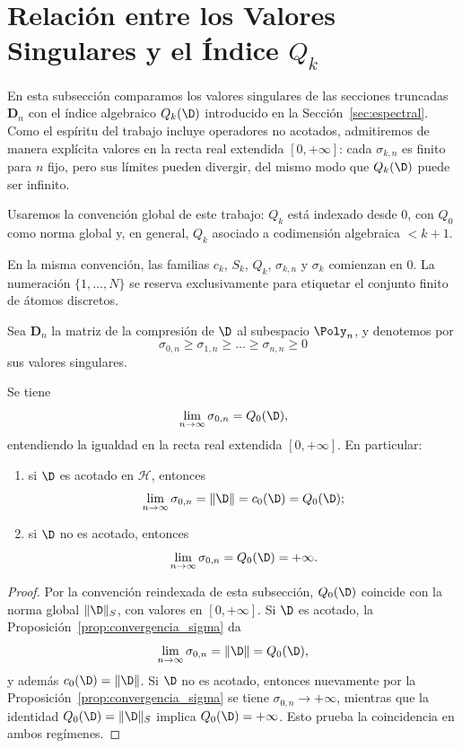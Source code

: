 \section{Relación entre los Valores Singulares y el Índice \texorpdfstring{$Q_k$}{Q_k}}

En esta subsección comparamos los valores singulares de las secciones truncadas $\mathbf{D}_n$ con el índice algebraico $Q_k(\D)$ introducido en la Sección~\ref{sec:espectral}. Como el espíritu del trabajo incluye operadores no acotados, admitiremos de manera explícita valores en la recta real extendida $[0,+\infty]$: cada $\sigma_{k,n}$ es finito para $n$ fijo, pero sus límites pueden divergir, del mismo modo que $Q_k(\D)$ puede ser infinito.

Usaremos la convención global de este trabajo: $Q_k$ está indexado desde $0$, con $Q_0$ como norma global y, en general, $Q_k$ asociado a codimensión algebraica $<k+1$.

En la misma convención, las familias $c_k$, $S_k$, $Q_k$, $\sigma_{k,n}$ y $\sigma_k$ comienzan en $0$. La numeración $\{1,\dots,N\}$ se reserva exclusivamente para etiquetar el conjunto finito de átomos discretos.

Sea $\mathbf{D}_n$ la matriz de la compresión de $\D$ al subespacio $\Poly_{n}$, y denotemos por
\[
	\sigma_{0,n} \ge \sigma_{1,n} \ge \dots \ge \sigma_{n,n} \ge 0
\]
sus valores singulares.

\begin{thm}\label{thm:sigma1_q1_extendido}
	Se tiene
	\[
		\lim_{n \to \infty} \sigma_{0,n} = Q_0(\D),
	\]
	entendiendo la igualdad en la recta real extendida $[0,+\infty]$. En particular:
	\begin{enumerate}
		\item si $\D$ es acotado en $\mathcal{H}$, entonces
		      \[
			      \lim_{n \to \infty} \sigma_{0,n} = \|\D\| = c_0(\D) = Q_0(\D);
		      \]
		\item si $\D$ no es acotado, entonces
		      \[
			      \lim_{n \to \infty} \sigma_{0,n} = Q_0(\D) = +\infty.
		      \]
	\end{enumerate}
\end{thm}

\begin{proof}
	Por la convención reindexada de esta subsección, $Q_0(\D)$ coincide con la norma global $\|\D\|_S$, con valores en $[0,+\infty]$. Si $\D$ es acotado, la Proposición~\ref{prop:convergencia_sigma} da
	\[
		\lim_{n \to \infty} \sigma_{0,n} = \|\D\| = Q_0(\D),
	\]
	y además $c_0(\D) = \|\D\|$. Si $\D$ no es acotado, entonces nuevamente por la Proposición~\ref{prop:convergencia_sigma} se tiene $\sigma_{0,n} \to +\infty$, mientras que la identidad $Q_0(\D) = \|\D\|_S$ implica $Q_0(\D) = +\infty$. Esto prueba la coincidencia en ambos regímenes.
\end{proof}

